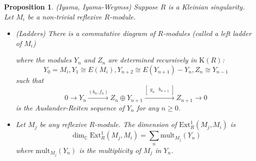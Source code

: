\documentclass{amsart}[12pt]
\newtheorem{prop}[theorem]{Proposition}
\theoremstyle{definition}
\theoremstyle{remark}
\numberwithin{equation}{section}
\begin{document}
\begin{prop}\label{ladder}(Iyama, Iyama-Weymss)
Suppose $R$ is a Kleinian singularity. Let $M_i$ be a non-trivial reflexive $R$-module. 
\begin{itemize}
\item[(i)] (Ladders) There is a commutative diagram of $R$-modules (called a left ladder of $M_i$)
\begin{center}
\end{center}
where the modules $Y_n$ and $Z_n$ are determined recursively in $\mathrm{K}(R)$:
\[
Y_0 = M_i, Y_1 \cong E(M_i), Y_{n + 2} \cong E(Y_{n + 1}) - Y_{n}, Z_n \cong Y_{n - 1}
\]
such that 
\[
0 \to Y_n \xrightarrow{(b_n, f_n)} Z_n \oplus Y_{n + 1} \xrightarrow{\begin{bmatrix} g_n & b_{n + 1} \end{bmatrix}} Z_{n + 1} \to 0
\]
is the Auslander-Reiten sequence of $Y_n$ for any $n \geq 0$.
\item[(ii)] Let $M_j$ be any reflexive $R$-module. The dimension of $\mathrm{Ext}^1_R(M_j, M_i)$ is 
\[
\dim_{\mathbb{C}} \mathrm{Ext}^1_R(M_j, M_i) = \sum_n \mathrm{mult}_{M_j}(Y_n)
\]
where $\mathrm{mult}_{M_j}(Y_n)$ is the multiplicity of $M_j$ in $Y_n$.
\end{itemize}
\end{prop}
\end{document}
